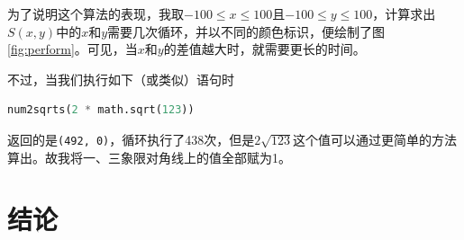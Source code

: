 \documentclass[a4paper, UTF8]{ctexart}
\begin{document}
为了说明这个算法的表现，我取$-100\leq x\leq100$且$-100\leq y\leq100$，计算求出$S(x,y)$中的$x$和$y$需要几次循环，并以不同的颜色标识，便绘制了图\ref{fig:perform}。可见，当$x$和$y$的差值越大时，就需要更长的时间。

不过，当我们执行如下（或类似）语句时
\begin{lstlisting}[language=python]
num2sqrts(2 * math.sqrt(123))
\end{lstlisting}
返回的是\verb|(492, 0)|，循环执行了438次，但是$2\sqrt{123}$这个值可以通过更简单的方法算出。故我将一、三象限对角线上的值全部赋为1。

\section{结论}
\end{document}
